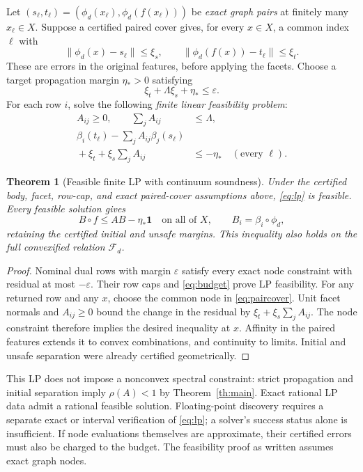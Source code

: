 \documentclass[journal,10pt]{IEEEtran}
\newtheorem{theorem}{Theorem}
\theoremstyle{definition}\newtheorem{definition}{Definition}
\theoremstyle{remark}
\newcommand{\one}{\mathbf 1}
\newcommand{\F}{\mathcal F_d}
\begin{document}
Let $(s_\ell,t_\ell)=(\phi_d(x_\ell),\phi_d(f(x_\ell)))$ be \emph{exact graph pairs} at finitely many $x_\ell\in X$. Suppose a certified paired cover gives, for every $x\in X$, a common index $\ell$ with
\begin{equation}\label{eq:paircover}
 \|\phi_d(x)-s_\ell\|\leq\xi_s,\qquad
 \|\phi_d(f(x))-t_\ell\|\leq\xi_t.
\end{equation}
These are errors in the original features, before applying the facets. Choose a target propagation margin $\eta_*>0$ satisfying
\begin{equation}\label{eq:budget}
 \xi_t+\Lambda\xi_s+\eta_*\leq\varepsilon.
\end{equation}
For each row $i$, solve the following \emph{finite linear feasibility problem}:
\begin{equation}\label{eq:lp}
 \begin{aligned}
 A_{ij}\geq0,\qquad \sum_jA_{ij}&\leq\Lambda,\\
 \beta_i(t_\ell)-\sum_jA_{ij}\beta_j(s_\ell)&\\
       {}+\xi_t+\xi_s\sum_jA_{ij}&\leq-\eta_*
       \quad(\text{every }\ell).
 \end{aligned}
\end{equation}

\begin{theorem}[Feasible finite LP with continuum soundness]\label{th:lp}
Under the certified body, facet, row-cap, and exact paired-cover assumptions above, \eqref{eq:lp} is feasible. Every feasible solution gives
\[
 B\circ f\leq AB-\eta_*\one\quad\text{on all of }X,\qquad B_i=\beta_i\circ\phi_d,
\]
retaining the certified initial and unsafe margins. This inequality also holds on the full convexified relation $\F$.
\end{theorem}
\begin{proof}
Nominal dual rows with margin $\varepsilon$ satisfy every exact node constraint with residual at most $-\varepsilon$. Their row caps and \eqref{eq:budget} prove LP feasibility. For any returned row and any $x$, choose the common node in \eqref{eq:paircover}. Unit facet normals and $A_{ij}\geq0$ bound the change in the residual by
$\xi_t+\xi_s\sum_jA_{ij}$. The node constraint therefore implies the desired inequality at $x$. Affinity in the paired features extends it to convex combinations, and continuity to limits. Initial and unsafe separation were already certified geometrically.
\end{proof}

This LP does not impose a nonconvex spectral constraint: strict propagation and initial separation imply $\rho(A)<1$ by Theorem~\ref{th:main}. Exact rational LP data admit a rational feasible solution. Floating-point discovery requires a separate exact or interval verification of \eqref{eq:lp}; a solver's success status alone is insufficient. If node evaluations themselves are approximate, their certified errors must also be charged to the budget. The feasibility proof as written assumes exact graph nodes.
\end{document}
